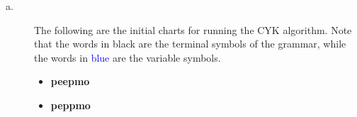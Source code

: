\documentclass[11pt]{article}
\begin{document}
\newpage

\begin{solution}

\begin{description}

\item[a.]  The following are the initial charts for running the CYK algorithm. Note that the words in black are the terminal symbols of the grammar, while the words in \textcolor{blue}{blue} are the variable symbols. \\


\begin{itemize}

    \item \textbf{peepmo} \\

\newpage

    \item \textbf{peppmo} \\


\end{itemize}
\end{description}
\end{solution}
\end{document}
